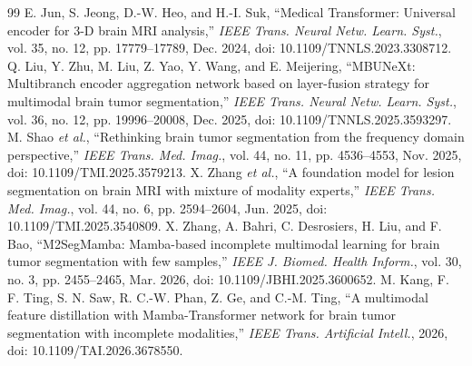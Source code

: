 \documentclass[conference]{IEEEtran}
\begin{document}
\begin{thebibliography}{99}
 E. Jun, S. Jeong, D.-W. Heo, and H.-I. Suk, ``Medical Transformer: Universal encoder for 3-D brain MRI analysis,'' \emph{IEEE Trans. Neural Netw. Learn. Syst.}, vol. 35, no. 12, pp. 17779--17789, Dec. 2024, doi: 10.1109/TNNLS.2023.3308712.
 Q. Liu, Y. Zhu, M. Liu, Z. Yao, Y. Wang, and E. Meijering, ``MBUNeXt: Multibranch encoder aggregation network based on layer-fusion strategy for multimodal brain tumor segmentation,'' \emph{IEEE Trans. Neural Netw. Learn. Syst.}, vol. 36, no. 12, pp. 19996--20008, Dec. 2025, doi: 10.1109/TNNLS.2025.3593297.
 M. Shao \emph{et al.}, ``Rethinking brain tumor segmentation from the frequency domain perspective,'' \emph{IEEE Trans. Med. Imag.}, vol. 44, no. 11, pp. 4536--4553, Nov. 2025, doi: 10.1109/TMI.2025.3579213.
 X. Zhang \emph{et al.}, ``A foundation model for lesion segmentation on brain MRI with mixture of modality experts,'' \emph{IEEE Trans. Med. Imag.}, vol. 44, no. 6, pp. 2594--2604, Jun. 2025, doi: 10.1109/TMI.2025.3540809.
 X. Zhang, A. Bahri, C. Desrosiers, H. Liu, and F. Bao, ``M2SegMamba: Mamba-based incomplete multimodal learning for brain tumor segmentation with few samples,'' \emph{IEEE J. Biomed. Health Inform.}, vol. 30, no. 3, pp. 2455--2465, Mar. 2026, doi: 10.1109/JBHI.2025.3600652.
 M. Kang, F. F. Ting, S. N. Saw, R. C.-W. Phan, Z. Ge, and C.-M. Ting, ``A multimodal feature distillation with Mamba-Transformer network for brain tumor segmentation with incomplete modalities,'' \emph{IEEE Trans. Artificial Intell.}, 2026, doi: 10.1109/TAI.2026.3678550.
\end{thebibliography}
\end{document}
